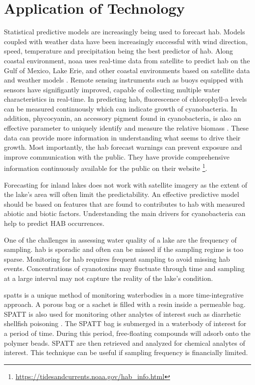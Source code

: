 \section{Application of Technology}
Statistical predictive models are increasingly being used to forecast \gls{hab}. Models coupled with weather data have been increasingly successful with wind direction, speed, temperature and precipitation being the best predictor of \gls{hab}. Along coastal environment,   \gls{noaa} uses real-time data from satellite to predict \gls{hab} on the Gulf of Mexico, Lake Erie, and other coastal environments based on satellite data and weather models \cite{kavanaugh_assessment_2013}. Remote sensing instruments such as buoys equipped with sensors have signifigantly improved, capable of collecting multiple water characteristics in real-time. In predicting \gls{hab}, fluorescence of chlorophyll-a levels can be measured continuously which can indicate growth of cyanobacteria. In addition, phycocyanin, an accessory pigment found in cyanobacteria, is also an effective parameter to uniquely identify and measure the relative biomass \cite{ahn_rainfall_2002,li_semi-analytical_2012}. These data can provide more information in understanding what seems to drive their growth. Most importantly, the \gls{hab} forecast warnings can prevent exposure and improve communication with the public. They have provide comprehensive information continuously available for the public on their website \footnote{\url{https://tidesandcurrents.noaa.gov/hab_info.html}}. 

Forecasting for inland lakes does not work with satellite imagery as the extent of the lake's area will often limit the predictability. An effective predictive model should be based on features that are found to contributes to \gls{hab} with measured abiotic and biotic factors. Understanding the main drivers for cyanobacteria can help to predict HAB occurrences.

One of the challenges in assessing water quality of a lake are the frequency of sampling. \gls{hab} is sporadic and often can be missed if the sampling regime is too sparse. Monitoring for \gls{hab} requires frequent sampling to avoid missing  \gls{hab} events. Concentrations of cyanotoxins may fluctuate through time and sampling at a large interval may not capture the reality of the lake's condition. 

\gls{spatts} is a unique method of monitoring waterbodies in a more time-integrative approach. A porous bag or a sachet is filled with a resin inside a permeable bag.
SPATT is also used for monitoring other analytes of interest such as diarrhetic shellfish poisoning \cite{mackenzie_solid_2004}. %
The SPATT bag  is submerged in a waterbody of interest for a period of time. During this period, free-floating compounds will adsorb onto the polymer beads.  SPATT are then retrieved and analyzed for chemical analytes of interest. This technique can be useful if sampling frequency is financially limited.




